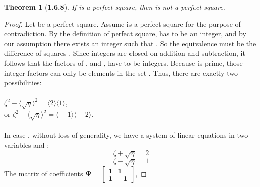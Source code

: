 \documentclass[a4paper, 12pt]{article}
\theoremstyle{plain}
\newtheorem*{theorem*}{Theorem}
\begin{document}
\begin{theorem*}[\textbf{1.6.8}]
    If \bm{$\eta$} is a perfect square, 
    then  is not a perfect square.
\end{theorem*}
\begin{proof}
    Let \bm{$\eta$} be a perfect square. 
    Assume  is a perfect square for the purpose of contradiction. 
    By the definition of perfect square, 
    \bm{$\sqrt{\eta}$} has to be an integer, 
    and by our assumption there exists an integer \bm{$\zeta$} such that 
    . 
    So the equivalence 
     must be the difference of squares 
    . 
    Since integers are closed on addition and subtraction, 
    it follows that the factors of , 
    \bm{$\big \langle \zeta + \sqrt{\eta} \big \rangle$} and 
    \bm{$\big \langle \zeta - \sqrt{\eta} \big \rangle$}, 
    have to be integers. 
    Because  is prime, those integer factors can only be elements in the set
    . Thus, there are exactly two possibilities:
    \\ \\ \indent \indent {} $\zeta ^2 - \big \langle \sqrt{\eta} \big \rangle ^2 = 
                            \big \langle 2 \big \rangle \big \langle 1 \big \rangle$,
    \\ \indent \indent or  $\zeta ^2 - \big \langle \sqrt{\eta} \big \rangle ^2 = 
                            \big \langle -1 \big \rangle \big \langle -2 \big \rangle.$
    \\ \\ In case , without loss of generality, 
    we have a system of linear equations in two variables \bm{$\zeta$} and \bm{$\sqrt{\eta}$}: 
    \begin{equation*}
        \zeta + \sqrt{\eta} = 2
    \end{equation*}
    \begin{equation*}
        \zeta - \sqrt{\eta} = 1
    \end{equation*}
    The matrix of coefficients 
    $\bm{\Psi =} \left[\begin{smallmatrix}
        \bm{1} & \bm{1} \\
        \bm{1} & \bm{-1} 
    \end{smallmatrix}\right]$, 

\end{proof}
\end{document}
